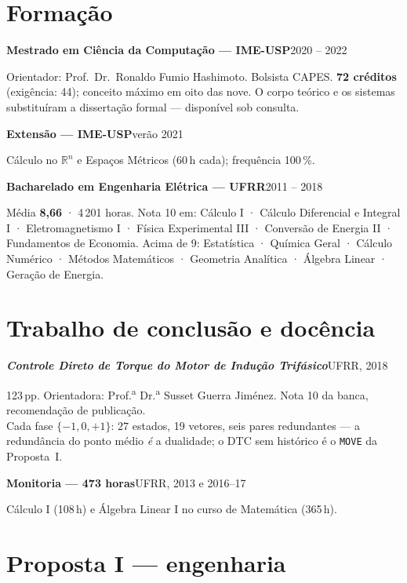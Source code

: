 \documentclass[11pt,a4paper]{article}
\newcommand{\lin}[2]{\noindent\textbf{#1}\hfill{\color{cinza}\small #2}\par}
\begin{document}
\section*{Formação}

\lin{Mestrado em Ciência da Computação --- IME-USP}{2020 -- 2022}
Orientador: Prof.\ Dr.\ Ronaldo Fumio Hashimoto. Bolsista CAPES.
\textbf{72 créditos} (exigência: 44); conceito máximo em oito das nove.
O corpo teórico e os sistemas substituíram a dissertação formal --- disponível sob consulta.

\smallskip
{}

\smallskip
\lin{Extensão --- IME-USP}{verão 2021}
Cálculo no $\mathbb{R}^n$ e Espaços Métricos (60\,h cada); frequência 100\,\%.

\smallskip
\lin{Bacharelado em Engenharia Elétrica --- UFRR}{2011 -- 2018}
Média \textbf{8{,}66} · 4\,201 horas.
Nota 10 em: Cálculo I · Cálculo Diferencial e Integral I · Eletromagnetismo I ·
Física Experimental III · Conversão de Energia II · Fundamentos de Economia.
Acima de 9: Estatística · Química Geral · Cálculo Numérico · Métodos Matemáticos ·
Geometria Analítica · Álgebra Linear · Geração de Energia.

\section*{Trabalho de conclusão e docência}

\lin{\emph{Controle Direto de Torque do Motor de Indução Trifásico}}{UFRR, 2018}
123\,pp. Orientadora: Prof.\textsuperscript{a} Dr.\textsuperscript{a} Susset Guerra Jiménez.
Nota 10 da banca, recomendação de publicação.
\\[1pt]
{\small Cada fase $\{-1,0,+1\}$: $27$ estados, 19 vetores, seis pares redundantes --- a
redundância do ponto médio \emph{é} a dualidade; o DTC sem histórico é o \texttt{MOVE}
da Proposta~I.}

\smallskip
\lin{Monitoria --- 473 horas}{UFRR, 2013 e 2016--17}
Cálculo I (108\,h) e Álgebra Linear I no curso de Matemática (365\,h).

\section*{Proposta I --- engenharia}
\end{document}
